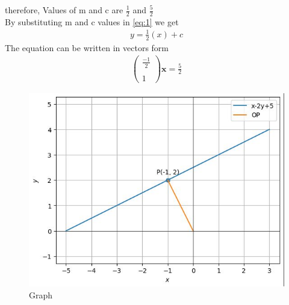 \documentclass[12pt]{article}
\newcommand{\myvec}[1]{\ensuremath{\begin{pmatrix}#1\end{pmatrix}}}
\let\vec\mathbf
\begin{document}
therefore,  Values of m and c are $\frac{1}{2}$ and $\frac{5}{2}$ \\
By substituting m and c values in \eqref{eq:1} we get 
\begin{align}
y=\frac{1}{2}(x) + c
\end{align}  
The equation can be written in vectors form
\begin{align}
  \myvec{\frac{-1}{2} \\ \\ 1}\vec{x}=\frac{5}{2}
\end{align}
\begin{figure}[H]
	\centering
	\includegraphics[width=\columnwidth]{graph.jpg}
	\caption{Graph}
	\label{fig:pic}
\end{figure}
\end{document}
